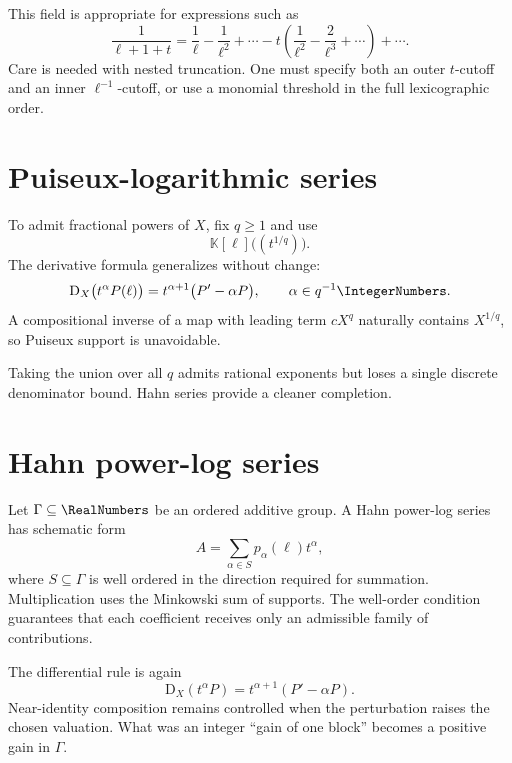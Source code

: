 \documentclass[11pt,oneside,openany]{book}
\newcommand{\K}{\mathbb{K}}
\newcommand{\D}{\mathrm{D}}
\begin{document}
This field is appropriate for expressions such as
\[
 \frac{1}{\ell+1+t}
 =\frac1\ell-\frac1{\ell^2}+\cdots
 -t\left(\frac1{\ell^2}-\frac2{\ell^3}+\cdots\right)+\cdots.
\]
Care is needed with nested truncation.  One must specify both an outer
\(t\)-cutoff and an inner \(\ell^{-1}\)-cutoff, or use a monomial threshold in
the full lexicographic order.

\section{Puiseux-logarithmic series}
To admit fractional powers of \(X\), fix \(q\geq1\) and use
\begin{equation}\label{eq:Puiseuxlog}
 \K[\ell]\bigl((t^{1/q})\bigr).
\end{equation}
The derivative formula generalizes without change:
\begin{equation}\label{eq:Puiseuxderivative}
 \D_X\bigl(t^\alpha P(\ell)\bigr)
 =t^{\alpha+1}\bigl(P'-\alpha P\bigr),
 \qquad \alpha\in q^{-1}\IntegerNumbers.
\end{equation}
A compositional inverse of a map with leading term \(cX^q\) naturally contains
\(X^{1/q}\), so Puiseux support is unavoidable.

Taking the union over all \(q\) admits rational exponents but loses a single
discrete denominator bound.  Hahn series provide a cleaner completion.

\section{Hahn power-log series}
Let \(\Gamma\subseteq\RealNumbers\) be an ordered additive group.  A Hahn
power-log series has schematic form
\begin{equation}\label{eq:Hahnpowerlog}
 A=\sum_{\alpha\in S}p_\alpha(\ell)t^\alpha,
\end{equation}
where \(S\subseteq\Gamma\) is well ordered in the direction required for
summation.  Multiplication uses the Minkowski sum of supports.  The well-order
condition guarantees that each coefficient receives only an admissible family
of contributions.

The differential rule is again
\[
 \D_X(t^\alpha P)=t^{\alpha+1}(P'-\alpha P).
\]
Near-identity composition remains controlled when the perturbation raises the
chosen valuation.  What was an integer ``gain of one block'' becomes a positive
gain in \(\Gamma\).
\end{document}
